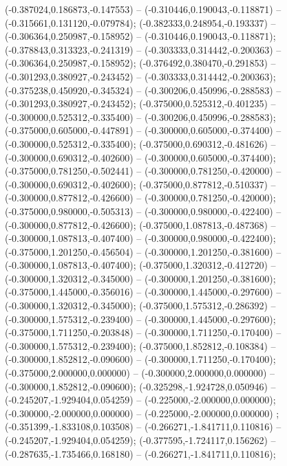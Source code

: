  (-0.387024,0.186873,-0.147553) -- (-0.310446,0.190043,-0.118871) -- (-0.315661,0.131120,-0.079784);
 (-0.382333,0.248954,-0.193337) -- (-0.306364,0.250987,-0.158952) -- (-0.310446,0.190043,-0.118871);
 (-0.378843,0.313323,-0.241319) -- (-0.303333,0.314442,-0.200363) -- (-0.306364,0.250987,-0.158952);
 (-0.376492,0.380470,-0.291853) -- (-0.301293,0.380927,-0.243452) -- (-0.303333,0.314442,-0.200363);
 (-0.375238,0.450920,-0.345324) -- (-0.300206,0.450996,-0.288583) -- (-0.301293,0.380927,-0.243452);
 (-0.375000,0.525312,-0.401235) -- (-0.300000,0.525312,-0.335400) -- (-0.300206,0.450996,-0.288583);
 (-0.375000,0.605000,-0.447891) -- (-0.300000,0.605000,-0.374400) -- (-0.300000,0.525312,-0.335400);
 (-0.375000,0.690312,-0.481626) -- (-0.300000,0.690312,-0.402600) -- (-0.300000,0.605000,-0.374400);
 (-0.375000,0.781250,-0.502441) -- (-0.300000,0.781250,-0.420000) -- (-0.300000,0.690312,-0.402600);
 (-0.375000,0.877812,-0.510337) -- (-0.300000,0.877812,-0.426600) -- (-0.300000,0.781250,-0.420000);
 (-0.375000,0.980000,-0.505313) -- (-0.300000,0.980000,-0.422400) -- (-0.300000,0.877812,-0.426600);
 (-0.375000,1.087813,-0.487368) -- (-0.300000,1.087813,-0.407400) -- (-0.300000,0.980000,-0.422400);
 (-0.375000,1.201250,-0.456504) -- (-0.300000,1.201250,-0.381600) -- (-0.300000,1.087813,-0.407400);
 (-0.375000,1.320312,-0.412720) -- (-0.300000,1.320312,-0.345000) -- (-0.300000,1.201250,-0.381600);
 (-0.375000,1.445000,-0.356016) -- (-0.300000,1.445000,-0.297600) -- (-0.300000,1.320312,-0.345000);
 (-0.375000,1.575312,-0.286392) -- (-0.300000,1.575312,-0.239400) -- (-0.300000,1.445000,-0.297600);
 (-0.375000,1.711250,-0.203848) -- (-0.300000,1.711250,-0.170400) -- (-0.300000,1.575312,-0.239400);
 (-0.375000,1.852812,-0.108384) -- (-0.300000,1.852812,-0.090600) -- (-0.300000,1.711250,-0.170400);
 (-0.375000,2.000000,0.000000) -- (-0.300000,2.000000,0.000000) -- (-0.300000,1.852812,-0.090600);
 (-0.325298,-1.924728,0.050946) -- (-0.245207,-1.929404,0.054259) -- (-0.225000,-2.000000,0.000000);
 (-0.300000,-2.000000,0.000000) -- (-0.225000,-2.000000,0.000000) ;
 (-0.351399,-1.833108,0.103508) -- (-0.266271,-1.841711,0.110816) -- (-0.245207,-1.929404,0.054259);
 (-0.377595,-1.724117,0.156262) -- (-0.287635,-1.735466,0.168180) -- (-0.266271,-1.841711,0.110816);
